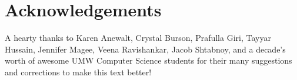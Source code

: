  
\chapter{Acknowledgements}

A hearty thanks to Karen Anewalt, Crystal Burson, Prafulla Giri, Tayyar
Hussain, Jennifer Magee, Veena Ravishankar, Jacob Shtabnoy, and a decade's
worth of awesome UMW Computer Science students for their many suggestions and
corrections to make this text better!

